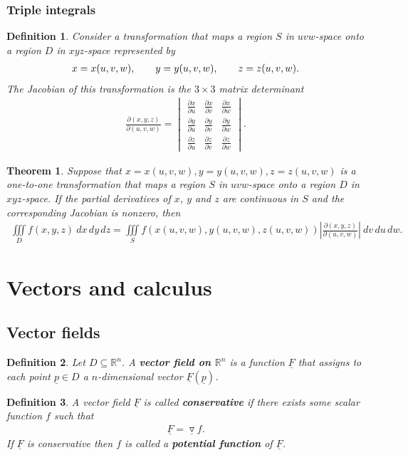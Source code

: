 \documentclass{article}
\theoremstyle{sltheorem}
\newtheorem{definition}{Definition}[section]
\newtheorem{theorem}{Theorem}[section]
\newcommand{\R}{\mathbb{R}}
\newcommand{\grad}{\vec\triangledown}
\newcommand{\ti}{\iiint\limits}
\newcommand{\hs}{\hspace{0.7cm}}
\renewcommand{\vec}{\underline}
\newcommand*\B[1]{\textbf{#1}}
\begin{document}
\subsubsection{Triple integrals}
\begin{definition}
    Consider a transformation that maps a region $S$ in $uvw$-space onto a region $D$ in
    $xyz$-space represented by
    \begin{align*}
        x=x(u,v,w),\hs y=y(u,v,w),\hs z=z(u,v,w).
    \end{align*}
    The Jacobian of this transformation is the $3\times3$ matrix determinant
    \begin{align*}
        \frac{\partial(x,y,z)}{\partial(u,v,w)}=\begin{vmatrix}
            \frac{\partial x}{\partial u}&\frac{\partial x}{\partial v}&\frac{\partial x}{\partial w}\\
            \frac{\partial y}{\partial u}&\frac{\partial y}{\partial v}&\frac{\partial y}{\partial w}\\
            \frac{\partial z}{\partial u}&\frac{\partial z}{\partial v}&\frac{\partial z}{\partial w}
        \end{vmatrix}.
    \end{align*}
\end{definition}
\begin{theorem}
    Suppose that $x=x(u,v,w),y=y(u,v,w),z=z(u,v,w)$ is a one-to-one transformation that maps a
    region $S$ in $uvw$-space onto a region $D$ in $xyz$-space. If the partial derivatives of
    $x$, $y$ and $z$ are continuous in $S$ and the corresponding Jacobian is nonzero,
    then
    \begin{align*}
       \ti_D f(x,y,z)\:dx\,dy\,dz = \ti_S f(x(u,v,w), y(u,v,w), z(u,v,w))\left|\frac{\partial(x,y,z)}{\partial(u,v,w)}\right|\:dv\,du\,dw. 
    \end{align*}
\end{theorem}
\section{Vectors and calculus}
\subsection{Vector fields}
\begin{definition}
    Let $D\subseteq \R^n$. A \B{vector field on $\R^n$} is a function $\vec F$ that assigns
    to each point $\vec p\in D$ a $n$-dimensional vector $\vec F(\vec p)$.
\end{definition}
\begin{definition}
    A vector field $\vec F$ is called \B{conservative} if there exists some scalar function
    $f$ such that
    \begin{align*}
        \vec F = \grad f.
    \end{align*}
    If $\vec F$ is conservative then $f$ is called a \B{potential function} of $\vec F$.
\end{definition}
\end{document}
